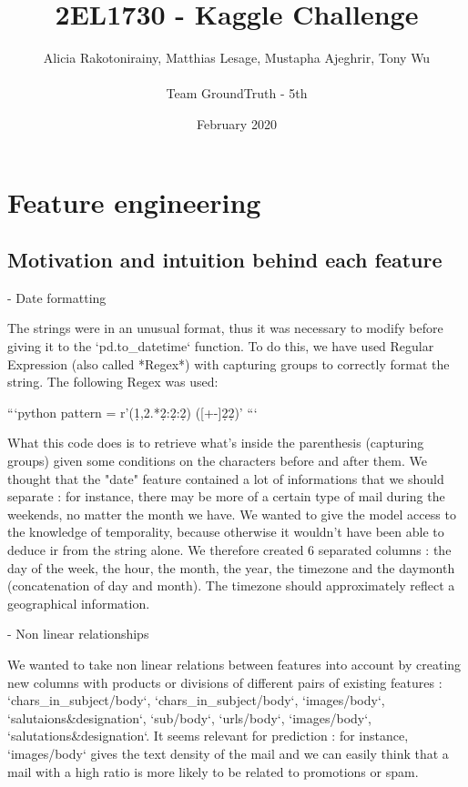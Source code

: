 \documentclass{article}
\title{2EL1730 - Kaggle Challenge}
\author{Alicia Rakotonirainy, Matthias Lesage, Mustapha Ajeghrir, Tony Wu \\ \\ Team GroundTruth - 5th}
\date{February 2020}
\begin{document}
\maketitle

\clearpage

\section{Feature engineering}
\subsection{Motivation and intuition behind each feature}

\begin{markdown}
- Date formatting

The strings were in an unusual format, thus it was necessary to modify before giving it to the `pd.to_datetime` function. To do this, we have used Regular Expression (also called *Regex*) with capturing groups to correctly format the string. The following Regex was used:

```python
pattern = r'(\d{1,2}.*\d{2}:\d{2}:\d{2}) ([+-]\d{2}\d{2})'
```

What this code does is to retrieve what's inside the parenthesis (capturing groups) given some conditions on the characters before and after them. We thought that the "date" feature contained a lot of informations that we should separate : for instance, there may be more of a certain type of mail during the weekends, no matter the month we have. We wanted to give the model access to the knowledge of temporality, because otherwise it wouldn't have been able to deduce ir from the string alone. We therefore created 6 separated columns : the day of the week, the hour, the month, the year, the timezone and the daymonth (concatenation of day and month). The timezone should approximately reflect a geographical information.

- Non linear relationships

We wanted to take non linear relations between features into account by creating new columns with products or divisions of different pairs of existing features : `chars_in_subject/body`, `chars_in_subject/body`, `images/body`, `salutaions&designation`, `sub/body`, `urls/body`, `images/body`, `salutations&designation`. It seems relevant for prediction : for instance, `images/body` gives the text density of the mail and we can easily think that a mail with a high ratio is more likely to be related to promotions or spam.


\end{markdown}
\end{document}
